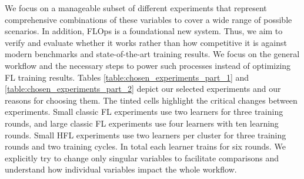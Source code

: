 We focus on a manageable subset of different experiments that represent comprehensive combinations of these variables to cover a wide range of possible scenarios.
In addition, FLOps is a foundational new system.
Thus, we aim to verify and evaluate whether it works rather than how competitive it is against modern benchmarks and state-of-the-art training results.
We focus on the general workflow and the necessary steps to power such processes instead of optimizing FL training results.
Tables \ref{table:chosen_experiments_part_1} and \ref{table:chosen_experiments_part_2} depict our selected experiments and our reasons for choosing them.
The tinted cells highlight the critical changes between experiments.
Small classic FL experiments use two learners for three training rounds, and large classic FL experiments use four learners with ten learning rounds.
Small HFL experiments use two learners per cluster for three training rounds and two training cycles.
In total each learner trains for six rounds.
We explicitly try to change only singular variables to facilitate comparisons and understand how individual variables impact the whole workflow.

\begin{figure}[p]
    
\end{figure}

\begin{figure}[H]
    
\end{figure}